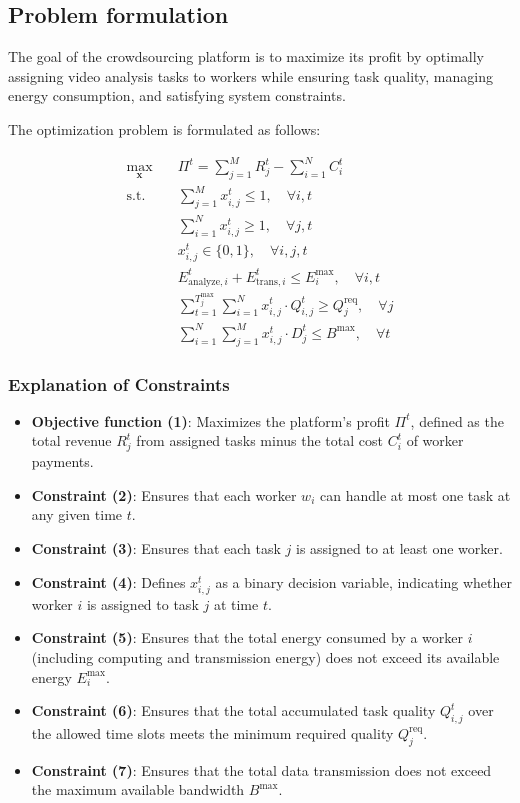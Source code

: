 \subsection{Problem formulation}
The goal of the crowdsourcing platform is to maximize its profit by optimally assigning video analysis tasks to workers while ensuring task quality, managing energy consumption, and satisfying system constraints.

The optimization problem is formulated as follows:

\begin{align}
    \max_{\mathbf{x}} \quad & \Pi^t = \sum_{j=1}^{M} R_j^t - \sum_{i=1}^{N} C_i^t  \tag{1} \\
    \text{s.t.} \quad 
    & \sum_{j=1}^{M} x_{i,j}^t \leq 1, \quad \forall i, t  \tag{2} \\
    & \sum_{i=1}^{N} x_{i,j}^t \geq 1, \quad \forall j, t  \tag{3} \\
    & x_{i,j}^t \in \{0,1\}, \quad \forall i,j,t  \tag{4} \\
    & E_{\text{analyze}, i}^t + E_{\text{trans}, i}^t \leq E_i^{\max}, \quad \forall i, t  \tag{5} \\
    & \sum_{t=1}^{T_j^{\max}} \sum_{i=1}^{N} x_{i,j}^t \cdot Q_{i,j}^t \geq Q_j^{\text{req}}, \quad \forall j  \tag{6} \\
    & \sum_{i=1}^{N} \sum_{j=1}^{M} x_{i,j}^t \cdot D_j^t \leq B^{\max}, \quad \forall t  \tag{7}
\end{align}

\subsubsection{Explanation of Constraints}
\begin{itemize}
    \item \textbf{Objective function (1)}: Maximizes the platform’s profit \( \Pi^t \), defined as the total revenue \( R_j^t \) from assigned tasks minus the total cost \( C_i^t \) of worker payments.
    \item \textbf{Constraint (2)}: Ensures that each worker \( w_i \) can handle at most one task at any given time \( t \).
    \item \textbf{Constraint (3)}: Ensures that each task \( j \) is assigned to at least one worker.
    \item \textbf{Constraint (4)}: Defines \( x_{i,j}^t \) as a binary decision variable, indicating whether worker \( i \) is assigned to task \( j \) at time \( t \).
    \item \textbf{Constraint (5)}: Ensures that the total energy consumed by a worker \( i \) (including computing and transmission energy) does not exceed its available energy \( E_i^{\max} \).
    \item \textbf{Constraint (6)}: Ensures that the total accumulated task quality \( Q_{i,j}^t \) over the allowed time slots meets the minimum required quality \( Q_j^{\text{req}} \).
    \item \textbf{Constraint (7)}: Ensures that the total data transmission does not exceed the maximum available bandwidth \( B^{\max} \).
\end{itemize}

